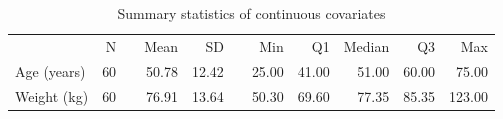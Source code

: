 \begin{table}[ht]
\centering
\caption{Summary statistics of continuous covariates} 
\label{tab:SumContCov}
\begingroup\footnotesize
\begin{tabular}{lrrrrrrrrrr}
  \toprule
   & N &   & Mean & SD &   & Min & Q1 & Median & Q3 & Max \\ 
    \cmidrule{2-2}  \cmidrule{4-5} \cmidrule{7-11}
 Age (years) &  60 &  & 50.78 & 12.42 &  & 25.00 & 41.00 & 51.00 & 60.00 & 75.00 \\ 
  Weight (kg) &  60 &  & 76.91 & 13.64 &  & 50.30 & 69.60 & 77.35 & 85.35 & 123.00 \\ 
   \bottomrule
\end{tabular}
\endgroup
\end{table}
